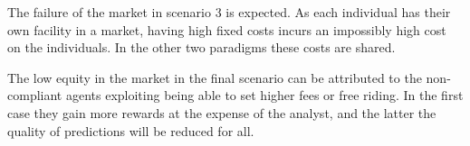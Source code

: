 The failure of the market in scenario 3 is expected. As each individual has
their own facility in a market, having high fixed costs incurs an impossibly
high cost on the individuals. In the other two paradigms these costs are
shared.

The low equity in the market in the final scenario can be attributed to the
non-compliant agents exploiting being able to set higher fees or free riding.
In the first case they gain more rewards at the expense of the analyst, and
the latter the quality of predictions will be reduced for all.






